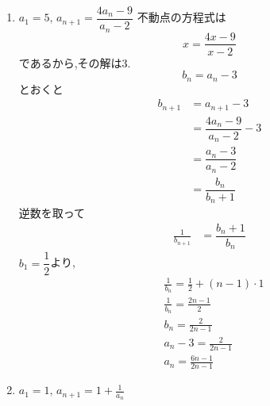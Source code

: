 \begin{enumerate}[label=(\arabic*),parsep=3pt,format=\bookitemlink{example-fractional-2}{solution}{problem}]
            このとき,
            \[
              \frac{p-r\alpha}{p-r\beta}=\frac{1-2}{1+2}=-\frac13
            \]
            なので,
            \[
              b_n=\frac{a_n-2}{a_n+2}
            \]
            と置くと,
            \begin{align*}
              &b_{n+1}=-\frac13 b_n,\quad b_1=\frac{a_1-2}{a_1+2}=\frac{-2}{2}=-1\\
              &\therefore \quad b_n=(-1)\left(-\frac13\right)^{n-1}=\frac{(-1)^n}{3^{n-1}}
            \end{align*}
            \[
              b_n=\frac{a_n-2}{a_n+2}
            \]
            を$a_n$について解くと,
            \[
              a_n=\frac{2(1+b_n)}{1-b_n}
            \]
            となるので,
            \[
              b_n=\frac{(-1)^n}{3^{n-1}}
            \]
            を代入し,分母分子に$3^{n-1}$を掛けて整理すると,
            \[
              a_n=\frac{2\left(3^{n-1}+(-1)^n\right)}{3^{n-1}-(-1)^n}
            \]
            を得る.
      \item $\displaystyle a_1=5,\, a_{n+1}=\dfrac{4a_{n}-9}{a_{n}-2}$
            不動点の方程式は
            \[
              x=\frac{4x-9}{x-2}
            \]
            であるから,その解は3.
            \[
            b_n=a_n-3
            \]
            とおくと
            \begin{align*}
              b_{n+1}&=a_{n+1}-3\\
              &=\dfrac{4a_{n}-9}{a_{n}-2}-3\\
              &=\dfrac{a_{n}-3}{a_{n}-2}\\
              &=\dfrac{b_{n}}{b_{n}+1}
            \end{align*}
            逆数を取って
            \begin{align*}
              \frac{1}{b_{n+1}}&=\dfrac{b_{n}+1}{b_{n}}
            \end{align*}
            $b_1=\dfrac{1}{2}$より,
            \begin{align*}
              &\frac{1}{b_n}=\frac{1}{2}+(n-1)\cdot 1\\
              &\frac{1}{b_n}=\frac{2n-1}{2}\\
              &b_n=\frac{2}{2n-1}\\
              &a_n-3=\frac{2}{2n-1}\\
              &a_n=\frac{6n-1}{2n-1}
            \end{align*}
      \item $\displaystyle a_1=1,\, a_{n+1}=1+\frac{1}{a_n}$\\

\end{enumerate}
